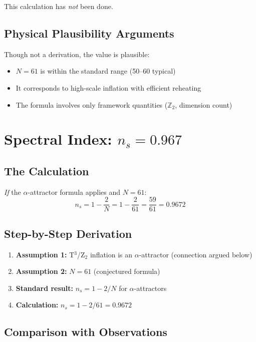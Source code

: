 \documentclass[12pt,a4paper]{article}
\begin{document}
This calculation has \textit{not} been done.

\subsection{Physical Plausibility Arguments}

Though not a derivation, the value is plausible:
\begin{itemize}
    \item $N = 61$ is within the standard range (50--60 typical)
    \item It corresponds to high-scale inflation with efficient reheating
    \item The formula involves only framework quantities ($\mathbb{Z}_2$, dimension count)
\end{itemize}

\section{Spectral Index: $n_s = 0.967$}

\subsection{The Calculation}

\textit{If} the $\alpha$-attractor formula applies and $N = 61$:
\begin{equation}
n_s = 1 - \frac{2}{N} = 1 - \frac{2}{61} = \frac{59}{61} = 0.9672
\end{equation}

\subsection{Step-by-Step Derivation}

\begin{enumerate}
    \item \textbf{Assumption 1:} T$^3$/Z$_2$ inflation is an $\alpha$-attractor (connection argued below)
    \item \textbf{Assumption 2:} $N = 61$ (conjectured formula)
    \item \textbf{Standard result:} $n_s = 1 - 2/N$ for $\alpha$-attractors
    \item \textbf{Calculation:} $n_s = 1 - 2/61 = 0.9672$
\end{enumerate}

\subsection{Comparison with Observations}
\end{document}
